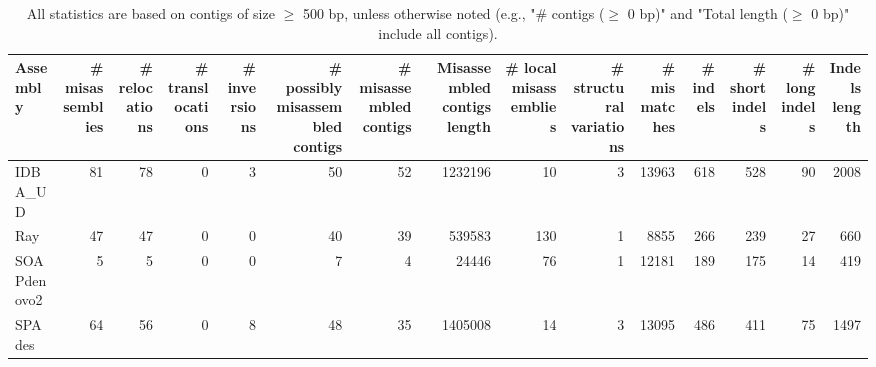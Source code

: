 \documentclass[12pt,a4paper]{article}
\begin{document}
\begin{table}[ht]
\begin{center}
\caption{All statistics are based on contigs of size $\geq$ 500 bp, unless otherwise noted (e.g., "\# contigs ($\geq$ 0 bp)" and "Total length ($\geq$ 0 bp)" include all contigs).}
\begin{tabular}{|l*{14}{|r}|}
\hline
Assembly & \# misassemblies &     \# relocations &     \# translocations &     \# inversions & \# possibly misassembled contigs & \# misassembled contigs & Misassembled contigs length & \# local misassemblies & \# structural variations & \# mismatches & \# indels &     \# short indels &     \# long indels & Indels length \\ \hline
IDBA\_UD & 81 & 78 & 0 & 3 & 50 & 52 & 1232196 & 10 & 3 & 13963 & 618 & 528 & 90 & 2008 \\ \hline
Ray & 47 & 47 & 0 & 0 & 40 & 39 & 539583 & 130 & 1 & 8855 & 266 & 239 & 27 & 660 \\ \hline
SOAPdenovo2 & 5 & 5 & 0 & 0 & 7 & 4 & 24446 & 76 & 1 & 12181 & 189 & 175 & 14 & 419 \\ \hline
SPAdes & 64 & 56 & 0 & 8 & 48 & 35 & 1405008 & 14 & 3 & 13095 & 486 & 411 & 75 & 1497 \\ \hline
\end{tabular}
\end{center}
\end{table}
\end{document}
